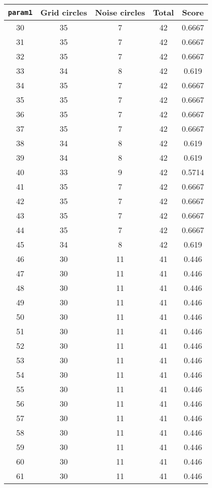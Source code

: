 \documentclass[letterpaper, 12pt]{article}
\begin{document}
\begin{longtable}{|c|c|c|c|c|}
\hline
\textbf{\texttt{param1}} & \textbf{Grid circles} & \textbf{Noise circles} & \textbf{Total} & \textbf{Score} \\
\hline
30 & 35 & 7 & 42 & 0.6667 \\
\hline
31 & 35 & 7 & 42 & 0.6667 \\
\hline
32 & 35 & 7 & 42 & 0.6667 \\
\hline
33 & 34 & 8 & 42 & 0.619 \\
\hline
34 & 35 & 7 & 42 & 0.6667 \\
\hline
35 & 35 & 7 & 42 & 0.6667 \\
\hline
36 & 35 & 7 & 42 & 0.6667 \\
\hline
37 & 35 & 7 & 42 & 0.6667 \\
\hline
38 & 34 & 8 & 42 & 0.619 \\
\hline
39 & 34 & 8 & 42 & 0.619 \\
\hline
40 & 33 & 9 & 42 & 0.5714 \\
\hline
41 & 35 & 7 & 42 & 0.6667 \\
\hline
42 & 35 & 7 & 42 & 0.6667 \\
\hline
43 & 35 & 7 & 42 & 0.6667 \\
\hline
44 & 35 & 7 & 42 & 0.6667 \\
\hline
45 & 34 & 8 & 42 & 0.619 \\
\hline
46 & 30 & 11 & 41 & 0.446 \\
\hline
47 & 30 & 11 & 41 & 0.446 \\
\hline
48 & 30 & 11 & 41 & 0.446 \\
\hline
49 & 30 & 11 & 41 & 0.446 \\
\hline
50 & 30 & 11 & 41 & 0.446 \\
\hline
51 & 30 & 11 & 41 & 0.446 \\
\hline
52 & 30 & 11 & 41 & 0.446 \\
\hline
53 & 30 & 11 & 41 & 0.446 \\
\hline
54 & 30 & 11 & 41 & 0.446 \\
\hline
55 & 30 & 11 & 41 & 0.446 \\
\hline
56 & 30 & 11 & 41 & 0.446 \\
\hline
57 & 30 & 11 & 41 & 0.446 \\
\hline
58 & 30 & 11 & 41 & 0.446 \\
\hline
59 & 30 & 11 & 41 & 0.446 \\
\hline
60 & 30 & 11 & 41 & 0.446 \\
\hline
61 & 30 & 11 & 41 & 0.446 \\

\end{longtable}
\end{document}
